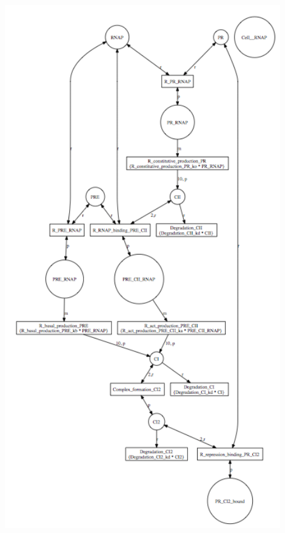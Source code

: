 \documentclass[titlepage,11pt]{article}
\begin{document}
\begin{center}
\includegraphics[width=120mm]{screenshots/viewNetwork}
\end{center}
\end{document}
